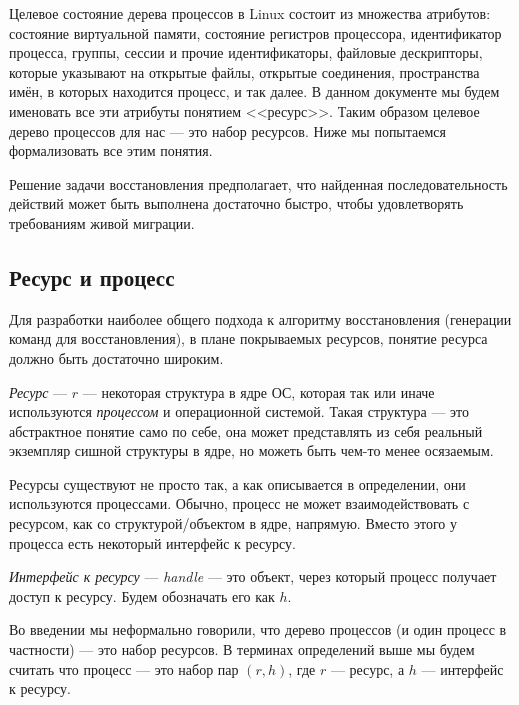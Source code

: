 Целевое состояние дерева процессов в Linux состоит из множества атрибутов: состояние виртуальной памяти, состояние регистров процессора, идентификатор процесса, группы, сессии и прочие идентификаторы, файловые дескрипторы, которые указывают на открытые файлы, открытые соединения, пространства имён, в которых находится процесс, и так далее. В данном документе мы будем именовать все эти атрибуты понятием <<ресурс>>. Таким образом целевое дерево процессов для нас --- это набор ресурсов. Ниже мы попытаемся формализовать все этим понятия.

Решение задачи восстановления предполагает, что найденная последовательность действий может быть выполнена достаточно быстро, чтобы удовлетворять требованиям живой миграции.

\subsection{Ресурс и процесс}

Для разработки наиболее общего подхода к алгоритму восстановления (генерации команд для восстановления), в плане покрываемых ресурсов, понятие ресурса должно быть достаточно широким.

\begin{defn}
\label{def:resource}
\emph{Ресурс} --- $r$ --- некоторая структура в ядре ОС, которая так или иначе используются \emph{процессом} и операционной системой. 
Такая структура --- это абстрактное понятие само по себе, она может представлять из себя реальный экземпляр сишной структуры в ядре, но можеть быть чем-то менее осязаемым.
\end{defn}

Ресурсы существуют не просто так, а как описывается в определении, они используются процессами. Обычно, процесс не может взаимодействовать с ресурсом, как со структурой/объектом в ядре, напрямую. Вместо этого у процесса есть некоторый интерфейс к ресурсу.

\begin{defn}
\emph{Интерфейс к ресурсу} --- \textit{handle} --- это объект, через который процесс получает доступ к ресурсу. Будем обозначать его как $h$.
\end{defn}

Во введении мы неформально говорили, что дерево процессов (и один процесс в частности) --- это набор ресурсов. В терминах определений выше мы будем считать что процесс --- это набор пар $(r, h)$, где $r$ --- ресурс, а $h$ --- интерфейс к ресурсу.

